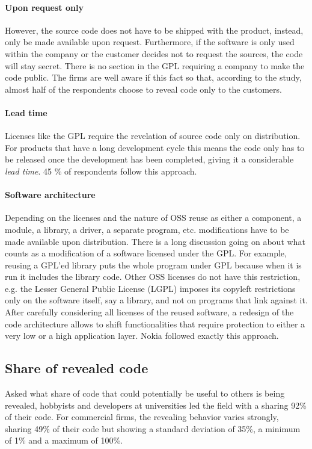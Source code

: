 \documentclass[a4paper]{scrartcl}
\begin{document}
\paragraph{Upon request only}
However, the source code does not have to be shipped with the product, instead, only be made available upon request.
Furthermore, if the software is only used within the company or the customer decides not to request the sources, the code will stay secret.
There is no section in the GPL requiring a company to make the code public.
The firms are well aware if this fact so that, according to the study, almost half of the respondents choose to reveal code only to the customers.

\paragraph{Lead time}
Licenses like the GPL require the revelation of source code only on distribution. 
For products that have a long development cycle this means the code only has to be released once the development has been completed, giving it a considerable \emph{lead time}.
45 \% of respondents follow this approach.

\paragraph{Software architecture}
Depending on the licenses and the nature of OSS reuse as either a component, a module, a library, a driver, a separate program, etc. modifications have to be made available upon distribution.
There is a long discussion going on about what counts as a modification of a software licensed under the GPL.
For example, reusing a GPL'ed library puts the whole program under GPL because when it is run it includes the library code.
Other OSS licenses do not have this restriction, e.g. the Lesser General Public License (LGPL) imposes its copyleft restrictions only on the software itself, say a library, and not on programs that link against it.
After carefully considering all licenses of the reused software, a redesign of the code architecture allows to shift functionalities that require protection to either a very low or a high application layer.
Nokia followed exactly this approach.

\subsection{Share of revealed code}

Asked what share of code that could potentially be useful to others is being revealed, hobbyists and developers at universities led the field with a sharing 92\% of their code. 
For commercial firms, the revealing behavior varies strongly, sharing 49\% of their code but showing a standard deviation of 35\%, a minimum of 1\% and a maximum of 100\%.
\end{document}
